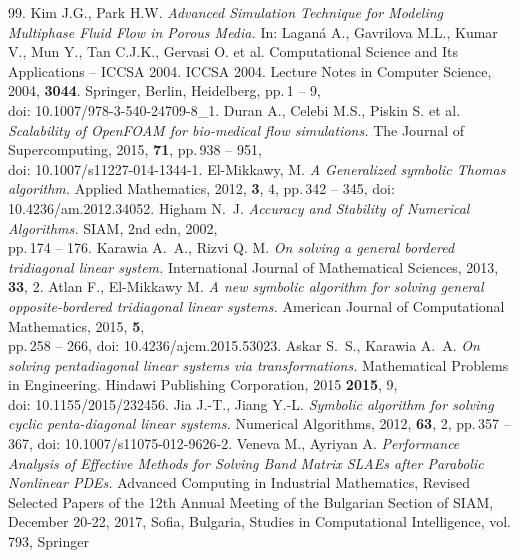 \documentclass[11pt, a4paper]{article}
\begin{document}
\begin{thebibliography}{99.}
 Kim J.G., Park H.W. {\it Advanced Simulation Technique for
    Modeling Multiphase Fluid Flow in Porous Media.} In: Lagan\'{a} A.,
    Gavrilova M.L., Kumar V., Mun Y., Tan C.J.K., Gervasi O. et al.
    Computational Science and Its Applications -- ICCSA 2004. ICCSA 2004.
    Lecture Notes in Computer Science, 2004, \textbf{3044}. Springer, Berlin,
    Heidelberg, pp.\,1 -- 9, \\
    doi: 10.1007/978-3-540-24709-8\_1.
 Duran A., Celebi M.S., Piskin S. et al. {\it Scalability of
    {OpenFOAM} for bio-medical flow simulations.} The Journal of Supercomputing,
    2015, \textbf{71}, pp.\,938 -- 951, \\
    doi: 10.1007/s11227-014-1344-1.
 El-Mikkawy, M. {\it A Generalized symbolic Thomas algorithm.}
    Applied Mathematics, 2012, \textbf{3}, 4, pp.\,342 -- 345, doi:
    10.4236/am.2012.34052.
 Higham N.~J. {\it Accuracy and Stability of Numerical
    Algorithms.} SIAM, 2nd edn, 2002, \\
    pp.\,174 -- 176.
 Karawia A.~A., Rizvi Q. M. {\it On solving a general
    bordered tridiagonal linear system.} International Journal of Mathematical
    Sciences, 2013, \textbf{33}, 2.
 Atlan F., El-Mikkawy M. {\it A new symbolic algorithm for
    solving general opposite-bordered tridiagonal linear systems.} American
    Journal of Computational Mathematics, 2015, \textbf{5}, \\
    pp.\,258 -- 266, doi: 10.4236/ajcm.2015.53023.
 Askar S.~S., Karawia A.~A. {\it On solving pentadiagonal linear
    systems via transformations.} Mathematical Problems in Engineering. Hindawi
    Publishing Corporation, 2015 \textbf{2015}, 9, \\
    doi: 10.1155/2015/232456.
    Jia J.-T., Jiang Y.-L. {\it Symbolic algorithm for solving cyclic
    penta-diagonal linear systems.} Numerical Algorithms, 2012, \textbf{63},
    2, pp.\,357 -- 367, doi: 10.1007/s11075-012-9626-2.
    Veneva M., Ayriyan A. {\it Performance Analysis of Effective Methods for
    Solving Band Matrix SLAEs after Parabolic Nonlinear PDEs.} Advanced
    Computing in Industrial Mathematics, Revised Selected Papers of the 12th
    Annual Meeting of the Bulgarian Section of SIAM, December 20-22, 2017,
    Sofia, Bulgaria, Studies in Computational Intelligence, vol. 793, Springer

\end{thebibliography}
\end{document}
